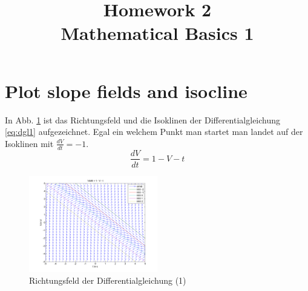 \documentclass[conference]{IEEEtran}
\begin{document}
%
%
\title{Homework 2\\ Mathematical Basics 1}

\author{
}


\maketitle

\IEEEpeerreviewmaketitle

\section{Plot slope fields and isocline}
In Abb. \ref{fig:fkt1} ist das Richtungsfeld und die Isoklinen der Differentialgleichung \eqref{eq:dgl1} aufgezeichnet. Egal ein welchem Punkt man startet man landet auf der Isoklinen mit $\frac{dV}{dt}=-1$.
\begin{equation}
	\frac{dV}{dt} = 1 - V - t
	\label{eq:dgl1}
\end{equation}
\begin{figure}
	\centering
	\includegraphics[width=0.5\textwidth]{img/fkt1.png}
	\caption{Richtungsfeld der Differentialgleichung (1)}
	\label{fig:fkt1}
\end{figure}
\end{document}
